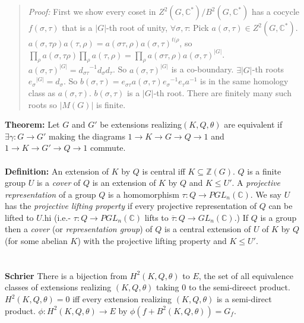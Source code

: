 \begin{quote}
\emph{Proof:}
First we show every coset in $Z^2(G, {\mathbb C}^*)/B^2(G, {\mathbb C}^*)$ has a cocycle $f(\sigma, \tau)$ that
is a $|G|$-th root of unity, $\forall \sigma, \tau$: Pick $a(\sigma, \tau) \in Z^2(G, {\mathbb C}^*)$.
$a(\sigma, \tau \rho) a(\tau, \rho) = a(\sigma \tau, \rho) a(\sigma, \tau)^{t(\rho}$, so
$\prod_{\rho} a(\sigma, \tau \rho) \prod_{\rho} a(\tau, \rho) = \prod_{\rho} a(\sigma \tau, \rho) a(\sigma, \tau)^{|G|}$.
$a(\sigma, \tau)^{|G|} = {d_{\sigma \tau}}^{-1} d_{\sigma} d_{\tau}$.  So $a(\sigma, \tau)^{|G|}$ is a co-boundary.
$\exists |G|$-th roots ${e_{\sigma}}^{|G|} = d_{\sigma}$.
So $b(\sigma, \tau) = e_{\sigma \tau} a(\sigma, \tau) {e_{\sigma}}^{-1} {{e_\tau}a}^{-1}$ is in the same homology class as
$a(\sigma , \tau)$.  $b(\sigma , \tau)$ is a $|G|$-th root.  There are finitely many such roots so $|M(G)|$ is finite.
\end{quote}
{\bf Theorem:} Let $G$ and $G'$ be extensions realizing$(K,Q, \theta)$ are equivalent if
$\exists \gamma: G \rightarrow G'$ making the diagrams
$1 \rightarrow K \rightarrow G \rightarrow Q \rightarrow 1$ and
$1 \rightarrow K \rightarrow G' \rightarrow Q \rightarrow 1$ commute.
\\
\\
{\bf Definition:} An extension of $K$ by $Q$ is central iff $ K \subseteq {\mathbb Z}(G)$.
$Q$ is a finite group $U$ is a \emph{cover} of $Q$
is an extension of $K$ by $Q$ and $K \leq U'$.
A \emph{projective representation} of a group $Q$ is a homomorphism
$\tau: Q \rightarrow PGL_n({\mathbb C})$.
We say $U$ has the \emph{projective lifting property} if every projective representation
of $Q$ can be lifted to $U$.hi (i.e.- $\tau:Q \rightarrow PGL_n({\mathbb C})$ lifts to
${\overline {\tau}}: Q \rightarrow GL_n({\mathbb C})$.)
If $Q$ is a group then a \emph{cover} (or \emph{representation group}) of $Q$ is a
central extension of $U$ of $K$ by $Q$ (for some abelian $K$) with the projective lifting property
and $K \le U'$.
\\
\\
\\
{\bf Schrier} There is a bijection from $H^2(K, Q, \theta)$ to $E$, the set of all equivalence classes
of extensions realizing $(K,Q,\theta)$ taking $0$ to the semi-direect product.  $H^2(K, Q, \theta) = 0$
iff every extension realizing $(K, Q, \theta)$ is a semi-direct product.  $\phi: H^2(K, Q, \theta) \rightarrow E$
by $\phi(f +  B^2(K,Q, \theta)) = G_{f}$.
\\
\\
